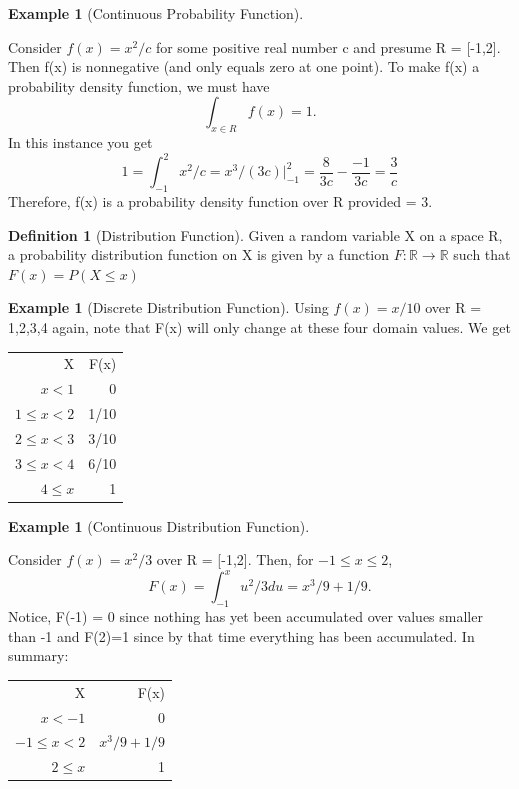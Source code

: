 \documentclass[10pt,]{book}
\theoremstyle{plain}
\theoremstyle{definition}
\newtheorem{definition}[theorem]{Definition}
\theoremstyle{definition}
\newtheorem{example}[theorem]{Example}
\theoremstyle{definition}
\numberwithin{equation}{section}
\newcommand{\hrulemedium}{\noalign{\hrule height 0.07em}}
\newcommand{\lt}{ < }
\begin{document}
\begin{example}[Continuous Probability Function]\label{example-16}

	Consider \(f(x) = x^2/c\) for some positive real number c and presume R = [-1,2]. Then f(x) is nonnegative (and only equals zero at one point). To make f(x) a probability density function, we must have
	\begin{equation*}\int_{x \in R} f(x) = 1.\end{equation*}
	In this instance you get
	\begin{equation*}1 = \int_{-1}^2 x^2/c = x^3/(3c) |_{-1}^2 = \frac{8}{3c} - \frac{-1}{3c} = \frac{3}{c}\end{equation*}
	Therefore, f(x) is a probability density function over R provided   = 3.
\end{example}
\begin{definition}[Distribution Function]\label{definition-29}
Given a random variable X on a space R, a probability distribution function on X is given by a function 
				   \(F:\mathbb{R} \rightarrow \mathbb{R}\) such that \(\displaystyle F(x)=P(X \le x)\)\end{definition}
\begin{example}[Discrete Distribution Function]\label{example-17}
Using \(f(x) = x/10\) over R = {1,2,3,4} again, note that F(x) will only change at these four domain values. We get
	
	\leavevmode%
\begin{table}
\centering
\begin{tabular}{rr}
X&F(x)\tabularnewline\hrulemedium
\(x \lt 1\)&0\tabularnewline[0pt]
\(1 \le x \lt 2\)&1/10\tabularnewline[0pt]
\(2 \le x \lt 3\)&3/10\tabularnewline[0pt]
\(3 \le x \lt 4\)&6/10\tabularnewline[0pt]
\(4 \le x \)&1
\end{tabular}
\end{table}

\end{example}
\begin{example}[Continuous Distribution Function]\label{example-18}

	Consider \(f(x) = x^2/3\) over R = [-1,2].  Then, for \(-1 \le x \le 2\),
	\begin{equation*}F(x) = \int_{-1}^x u^2/3 du = x^3/9 + 1/9.\end{equation*}
	Notice, F(-1) = 0 since nothing has yet been accumulated over values smaller than -1 and F(2)=1 since by that time everything has been accumulated. In summary:
	
	\leavevmode%
\begin{table}
\centering
\begin{tabular}{rr}
X&F(x)\tabularnewline\hrulemedium
\(x \lt -1\)&0\tabularnewline[0pt]
\(-1 \le x \lt 2\)&\(x^3/9 + 1/9\)\tabularnewline[0pt]
\(2 \le x\)&1
\end{tabular}
\end{table}

	
	
\end{example}
\typeout{************************************************}
\typeout{************************************************}
\end{document}
